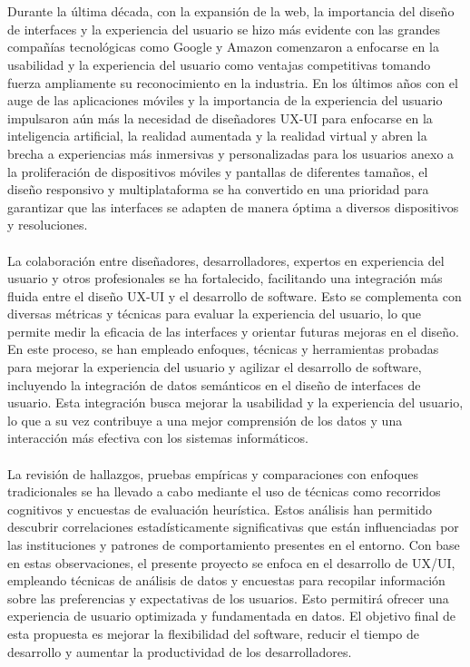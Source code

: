 \documentclass[12pt,a4paper]{article}
\begin{document}
\\\\
Durante la última década, con la expansión de la web, la importancia del diseño de interfaces y la experiencia del usuario se hizo más evidente con las grandes compañías tecnológicas como Google y Amazon comenzaron a enfocarse en la usabilidad y la experiencia del usuario como ventajas competitivas tomando fuerza ampliamente su reconocimiento en la industria. 
En los últimos años con el auge de las aplicaciones móviles y la importancia de la experiencia del usuario impulsaron aún más la necesidad de diseñadores UX-UI para enfocarse en la inteligencia artificial, la realidad aumentada y la realidad virtual y abren la brecha a experiencias más inmersivas y personalizadas para los usuarios anexo a la proliferación de dispositivos móviles y pantallas de diferentes tamaños, el diseño responsivo y multiplataforma se ha convertido en una prioridad para garantizar que las interfaces se adapten de manera óptima a diversos dispositivos y resoluciones.
\\\\
La colaboración entre diseñadores, desarrolladores, expertos en experiencia del usuario y otros profesionales se ha fortalecido, facilitando una integración más fluida entre el diseño UX-UI y el desarrollo de software. Esto se complementa con diversas métricas y técnicas para evaluar la experiencia del usuario, lo que permite medir la eficacia de las interfaces y orientar futuras mejoras en el diseño. En este proceso, se han empleado enfoques, técnicas y herramientas probadas para mejorar la experiencia del usuario y agilizar el desarrollo de software, incluyendo la integración de datos semánticos en el diseño de interfaces de usuario. Esta integración busca mejorar la usabilidad y la experiencia del usuario, lo que a su vez contribuye a una mejor comprensión de los datos y una interacción más efectiva con los sistemas informáticos.
\\\\
La revisión de hallazgos, pruebas empíricas y comparaciones con enfoques tradicionales se ha llevado a cabo mediante el uso de técnicas como recorridos cognitivos y encuestas de evaluación heurística. Estos análisis han permitido descubrir correlaciones estadísticamente significativas que están influenciadas por las instituciones y patrones de comportamiento presentes en el entorno. Con base en estas observaciones, el presente proyecto se enfoca en el desarrollo de UX/UI, empleando técnicas de análisis de datos y encuestas para recopilar información sobre las preferencias y expectativas de los usuarios. Esto permitirá ofrecer una experiencia de usuario optimizada y fundamentada en datos. El objetivo final de esta propuesta es mejorar la flexibilidad del software, reducir el tiempo de desarrollo y aumentar la productividad de los desarrolladores.
\end{document}
